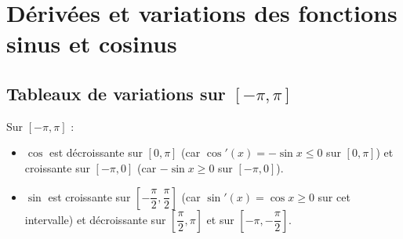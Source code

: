 
\section{Dérivées et variations des fonctions sinus et cosinus}





\subsection{Tableaux de variations sur $[-\pi, \pi]$}

Sur $[-\pi, \pi]$ :
\begin{itemize}
  \item $\cos$ est décroissante sur $[0, \pi]$ (car $\cos'(x) = -\sin x \leq 0$ sur $[0,\pi]$) et croissante sur $[-\pi, 0]$ (car $-\sin x \geq 0$ sur $[-\pi,0]$).
  \item $\sin$ est croissante sur $\left[-\dfrac{\pi}{2}, \dfrac{\pi}{2}\right]$ (car $\sin'(x) = \cos x \geq 0$ sur cet intervalle) et décroissante sur $\left[\dfrac{\pi}{2}, \pi\right]$ et sur $\left[-\pi, -\dfrac{\pi}{2}\right]$.
\end{itemize}


